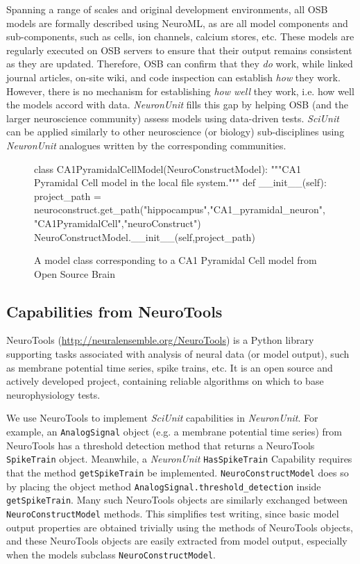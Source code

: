 \documentclass{frontiersSCNS}
\let\verbx\lstinline
\begin{document}
Spanning a range of scales and original development environments, all OSB models are formally described using NeuroML, as are all model components and sub-components, such as cells, ion channels, calcium stores, etc. 
These models are regularly executed on OSB servers to ensure that their output remains consistent as they are updated. 
Therefore, OSB can confirm that they \textit{do} work, while linked journal articles, on-site wiki, and code inspection can establish \textit{how} they work. 
However, there is no mechanism for establishing \textit{how well} they work, i.e. how well the models accord with data. 
\textit{NeuronUnit} fills this gap by helping OSB (and the larger neuroscience community) assess models using data-driven tests. 
\textit{SciUnit} can be applied similarly to other neuroscience (or biology) sub-disciplines using \textit{NeuronUnit} analogues written by the corresponding communities.    

\begin{figure}
\begin{python}
class CA1PyramidalCellModel(NeuroConstructModel):
	"""CA1 Pyramidal Cell model in the local file system."""
	def __init__(self):
		project_path = neuroconstruct.get_path("hippocampus","CA1_pyramidal_neuron","CA1PyramidalCell","neuroConstruct")
		NeuroConstructModel.__init__(self,project_path)
\end{python}
\vspace{-5px}
\caption{A model class corresponding to a CA1 Pyramidal Cell model from Open Source Brain}
\label{fig:ca1_model}
\vspace{-15px}
\end{figure}

\subsection{Capabilities from NeuroTools}
NeuroTools (\url{http://neuralensemble.org/NeuroTools}) is a Python library supporting tasks associated with analysis of neural data (or model output), such as membrane potential time series, spike trains, etc. 
It is an open source and actively developed project, containing reliable algorithms on which to base neurophysiology tests.

We use NeuroTools to implement \textit{SciUnit} capabilities in \textit{NeuronUnit}. 
For example, an \verbx{AnalogSignal} object (e.g. a membrane potential time series) from NeuroTools has a threshold detection method that returns a NeuroTools \verbx{SpikeTrain} object. 
Meanwhile, a \textit{NeuronUnit} \verbx{HasSpikeTrain} Capability requires that the method \verbx{getSpikeTrain} be implemented. 
\verbx{NeuroConstructModel} does so by placing the object method \verbx{AnalogSignal.threshold_detection} inside \verbx{getSpikeTrain}. 
Many such NeuroTools objects are similarly exchanged between \verbx{NeuroConstructModel} methods. 
This simplifies test writing, since basic model output properties are obtained trivially using the methods of NeuroTools objects, and these NeuroTools objects are easily extracted from model output, especially when the models subclass \verbx{NeuroConstructModel}.  
\end{document}

